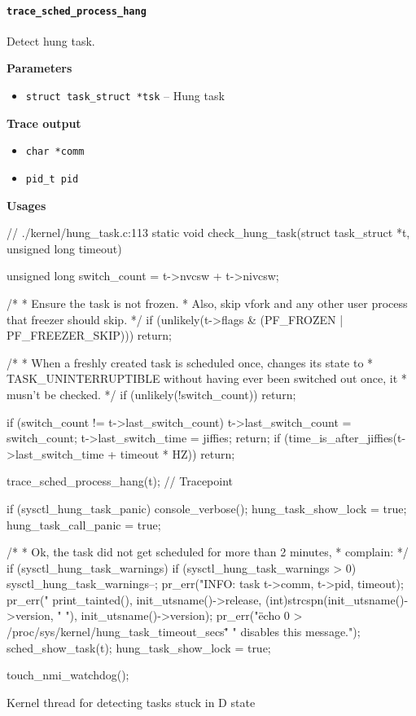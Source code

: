 \paragraph{\texttt{trace\_sched\_process\_hang}}
Detect hung task.

\textbf{Parameters}
\begin{itemize}
    \item \verb|struct task_struct *tsk| -- Hung task
\end{itemize}

\textbf{Trace output}
\begin{itemize}
    \item \verb|char *comm|
    \item \verb|pid_t pid|
\end{itemize}

\textbf{Usages}
\begin{code}
// ./kernel/hung_task.c:113
static void check_hung_task(struct task_struct *t, unsigned long timeout){
	unsigned long switch_count = t->nvcsw + t->nivcsw;

	/*
	 * Ensure the task is not frozen.
	 * Also, skip vfork and any other user process that freezer should skip.
	 */
	if (unlikely(t->flags & (PF_FROZEN | PF_FREEZER_SKIP)))
	    return;

	/*
	 * When a freshly created task is scheduled once, changes its state to
	 * TASK_UNINTERRUPTIBLE without having ever been switched out once, it
	 * musn't be checked.
	 */
	if (unlikely(!switch_count))
		return;

	if (switch_count != t->last_switch_count) {
		t->last_switch_count = switch_count;
		t->last_switch_time = jiffies;
		return;
	}
	if (time_is_after_jiffies(t->last_switch_time + timeout * HZ))
		return;

	trace_sched_process_hang(t); // Tracepoint

	if (sysctl_hung_task_panic) {
		console_verbose();
		hung_task_show_lock = true;
		hung_task_call_panic = true;
	}

	/*
	 * Ok, the task did not get scheduled for more than 2 minutes,
	 * complain:
	 */
	if (sysctl_hung_task_warnings) {
		if (sysctl_hung_task_warnings > 0)
			sysctl_hung_task_warnings--;
		pr_err("INFO: task %
			t->comm, t->pid, timeout);
		pr_err("      %
			print_tainted(), init_utsname()->release,
			(int)strcspn(init_utsname()->version, " "),
			init_utsname()->version);
		pr_err("\"echo 0 > /proc/sys/kernel/hung_task_timeout_secs\""
			" disables this message.\n");
		sched_show_task(t);
		hung_task_show_lock = true;
	}

	touch_nmi_watchdog();
}
\end{code}
Kernel thread for detecting tasks stuck in D state
  
